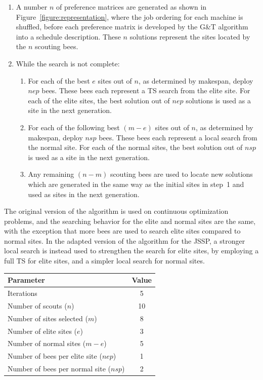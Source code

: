 \documentclass[paper=a4, fontsize=9pt]{scrartcl}
\begin{document}
\begin{multicols}{2}
\begin{enumerate}
    \item A number $n$ of preference matrices are generated as shown in Figure~\ref{figure:representation}, where the job ordering for each machine is shuffled, before each preference matrix is developed by the G\&T algorithm into a schedule description. These $n$ solutions represent the sites located by the $n$ scouting bees.
    \item While the search is not complete:
    \begin{enumerate}
        \item For each of the best $e$ sites out of $n$, as determined by makespan, deploy $nep$ bees. These bees each represent a \ac{TS} search from the elite site. For each of the elite sites, the best solution out of $nep$ solutions is used as a site in the next generation.
        \item For each of the following best $(m-e)$ sites out of $n$, as determined by makespan, deploy $nsp$ bees. These bees each represent a local search from the normal site. For each of the normal sites, the best solution out of $nsp$ is used as a site in the next generation.
        \item Any remaining $(n-m)$ scouting bees are used to locate new solutions which are generated in the same way as the initial sites in step~1 and used as sites in the next generation.
    \end{enumerate}
\end{enumerate}

The original version of the algorithm \cite{pham2011bees} is used on continuous optimization problems, and the searching behavior for the elite and normal sites are the same, with the exception that more bees are used to search elite sites compared to normal sites. In the adapted version of the algorithm for the \ac{JSSP}, a stronger local search is instead used to strengthen the search for elite sites, by employing a full \ac{TS} for elite sites, and a simpler local search for normal sites.

{
\vspace{0.2cm}
\begin{minipage}{\linewidth{}}
\centering
\begin{tabular}{lc}
\toprule
Parameter                              & Value \\
\midrule
Iterations                             &  5 \\
Number of scouts ($n$)                 & 10 \\
Number of sites selected ($m$)         &  8 \\
Number of elite sites ($e$)            &  3 \\
Number of normal sites ($m-e$)         &  5 \\
Number of bees per elite site ($nep$)  &  1 \\
Number of bees per normal site ($nsp$) &  2 \\
\bottomrule
\end{tabular}
\vspace{-0.2cm}
\label{table:baparams}
\end{minipage}
}


\end{multicols}
\end{document}
